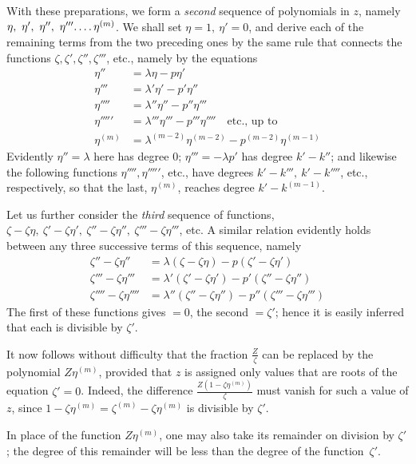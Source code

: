 With these preparations, we form a \textit{second} sequence of polynomials in $z$, namely $\eta,\ \eta',\ \eta'',\ \eta'''\ldotp\ldotp\ldotp\ldotp\eta^{(m)}$. We shall set $\eta=1,\ \eta'=0$, and derive each of the remaining terms from the two preceding ones by the same rule that connects the functions $\zeta,\zeta',\zeta'',\zeta'''$, etc., namely by the equations
\[
\begin{aligned}
\eta''&=\lambda\eta-p\eta'\\
\eta'''&=\lambda'\eta'-p'\eta''\\
\eta''''&=\lambda''\eta''-p''\eta'''\\
\eta'''''&=\lambda'''\eta'''-p'''\eta''''\quad\text{etc., up to}\\
\eta^{(m)}&=\lambda^{(m-2)}\eta^{(m-2)}-p^{(m-2)}\eta^{(m-1)}
\end{aligned}
\]
Evidently $\eta''=\lambda$ here has degree $0$; $\eta'''=-\lambda p'$ has degree $k'-k''$; and likewise the following functions $\eta'''',\eta'''''$, etc., have degrees $k'-k''',\ k'-k''''$, etc., respectively, so that the last, $\eta^{(m)}$, reaches degree $k'-k^{(m-1)}$.

Let us further consider the \textit{third} sequence of functions, $\zeta-\zeta\eta,\ \zeta'-\zeta\eta',\ \zeta''-\zeta\eta'',\ \zeta'''-\zeta\eta'''$, etc. A similar relation evidently holds between any three successive terms of this sequence, namely
\[
\begin{aligned}
\zeta''-\zeta\eta''&=\lambda(\zeta-\zeta\eta)-p(\zeta'-\zeta\eta')\\
\zeta'''-\zeta\eta'''&=\lambda'(\zeta'-\zeta\eta')-p'(\zeta''-\zeta\eta'')\\
\zeta''''-\zeta\eta''''&=\lambda''(\zeta''-\zeta\eta'')-p''(\zeta'''-\zeta\eta''')
\end{aligned}
\]
The first of these functions gives $=0$, the second $=\zeta'$; hence it is easily inferred that each is divisible by $\zeta'$.

It now follows without difficulty that the fraction $\frac Z\zeta$ can be replaced by the polynomial $Z\eta^{(m)}$, provided that $z$ is assigned only values that are roots of the equation $\zeta'=0$. Indeed, the difference $\frac{Z(1-\zeta\eta^{(m)})}{\zeta}$ must vanish for such a value of $z$, since $1-\zeta\eta^{(m)}=\zeta^{(m)}-\zeta\eta^{(m)}$ is divisible by $\zeta'$.

In place of the function $Z\eta^{(m)}$, one may also take its remainder on division by $\zeta'$; the degree of this remainder will be less than the degree of the \mbox{function $\zeta'$}.

